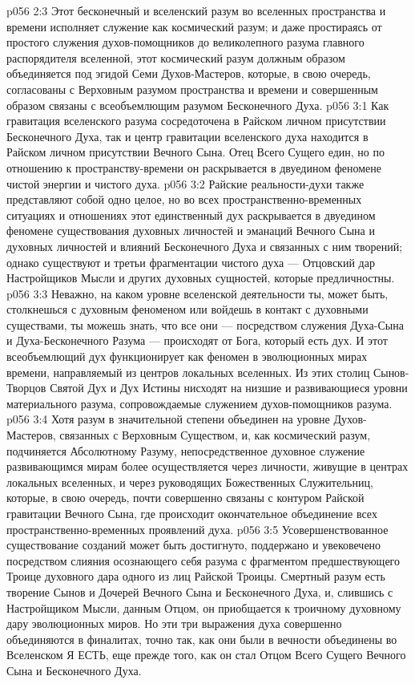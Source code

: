 \vs p056 2:3 Этот бесконечный и вселенский разум во вселенных пространства и времени исполняет служение как космический разум; и даже простираясь от простого служения духов\hyp{}помощников до великолепного разума главного распорядителя вселенной, этот космический разум должным образом объединяется под эгидой Семи Духов\hyp{}Мастеров, которые, в свою очередь, согласованы с Верховным разумом пространства и времени и совершенным образом связаны с всеобъемлющим разумом Бесконечного Духа.
\vs p056 3:1 Как гравитация вселенского разума сосредоточена в Райском личном присутствии Бесконечного Духа, так и центр гравитации вселенского духа находится в Райском личном присутствии Вечного Сына. Отец Всего Сущего един, но по отношению к пространству\hyp{}времени он раскрывается в двуедином феномене чистой энергии и чистого духа.
\vs p056 3:2 Райские реальности\hyp{}духи также представляют собой одно целое, но во всех пространственно\hyp{}временных ситуациях и отношениях этот единственный дух раскрывается в двуедином феномене существования духовных личностей и эманаций Вечного Сына и духовных личностей и влияний Бесконечного Духа и связанных с ним творений; однако существуют и третьи фрагментации чистого духа --- Отцовский дар Настройщиков Мысли и других духовных сущностей, которые предличностны.
\vs p056 3:3 \pc Неважно, на каком уровне вселенской деятельности ты, может быть, столкнешься с духовным феноменом или войдешь в контакт с духовными существами, ты можешь знать, что все они --- посредством служения Духа\hyp{}Сына и Духа\hyp{}Бесконечного Разума --- происходят от Бога, который есть дух. И этот всеобъемлющий дух функционирует как феномен в эволюционных мирах времени, направляемый из центров локальных вселенных. Из этих столиц Сынов\hyp{}Творцов Святой Дух и Дух Истины нисходят на низшие и развивающиеся уровни материального разума, сопровождаемые служением духов\hyp{}помощников разума.
\vs p056 3:4 Хотя разум в значительной степени объединен на уровне Духов\hyp{}Мастеров, связанных с Верховным Существом, и, как космический разум, подчиняется Абсолютному Разуму, непосредственное духовное служение развивающимся мирам более осуществляется через личности, живущие в центрах локальных вселенных, и через руководящих Божественных Служительниц, которые, в свою очередь, почти совершенно связаны с контуром Райской гравитации Вечного Сына, где происходит окончательное объединение всех пространственно\hyp{}временных проявлений духа.
\vs p056 3:5 \pc Усовершенствованное существование созданий может быть достигнуто, поддержано и увековечено посредством слияния осознающего себя разума с фрагментом предшествующего Троице духовного дара одного из лиц Райской Троицы. Смертный разум есть творение Сынов и Дочерей Вечного Сына и Бесконечного Духа, и, слившись с Настройщиком Мысли, данным Отцом, он приобщается к троичному духовному дару эволюционных миров. Но эти три выражения духа совершенно объединяются в финалитах, точно так, как они были в вечности объединены во Вселенском Я ЕСТЬ, еще прежде того, как он стал Отцом Всего Сущего Вечного Сына и Бесконечного Духа.
